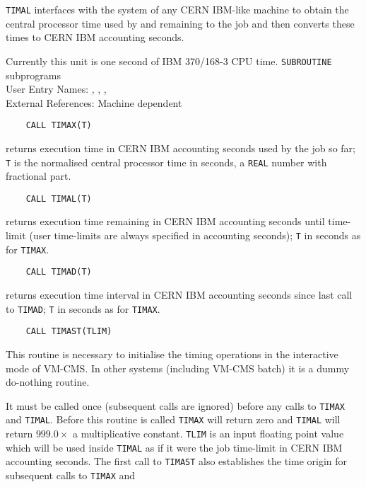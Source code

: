                    
      
\Submitter{}                            
                    
{\tt TIMAL} interfaces with the system of any CERN IBM-like machine to
obtain the central processor time used by and remaining to the job
and then converts these times to CERN IBM accounting seconds.
\par
Currently this unit is one second of IBM 370/168-3 CPU time.
\Structure
{\tt SUBROUTINE} subprograms \\
User Entry Names: , , ,
\\
External References: Machine dependent
\Usage
\begin{verbatim}
    CALL TIMAX(T)
\end{verbatim}
returns execution time in CERN IBM accounting seconds used by the job
so far; {\tt T} is the normalised central processor time in seconds,
a {\tt REAL} number with fractional part.
\begin{verbatim}
    CALL TIMAL(T)
\end{verbatim}
returns execution time remaining in CERN IBM accounting seconds
until time-limit (user time-limits are always specified in accounting
seconds); {\tt T} in  seconds as for {\tt TIMAX}.
\begin{verbatim}
    CALL TIMAD(T)
\end{verbatim}
returns execution time interval in CERN IBM accounting seconds
since last call to {\tt TIMAD}; {\tt T} in seconds as for {\tt TIMAX}.
\begin{verbatim}
    CALL TIMAST(TLIM)
\end{verbatim}
This routine is necessary to initialise the timing operations
in the interactive mode of VM-CMS. In other systems (including VM-CMS
batch) it is a dummy do-nothing routine.
\par
It must be called once (subsequent calls are ignored) before any
calls to {\tt TIMAX} and {\tt TIMAL}. Before this routine is called
{\tt TIMAX} will return zero and {\tt TIMAL} will return
$999.0 \times$ a multiplicative constant. {\tt TLIM} is an input floating
point value which will be used inside {\tt TIMAL} as if it were the job
time-limit in CERN IBM accounting seconds. The first call to {\tt TIMAST}
also establishes the time origin for subsequent calls to {\tt TIMAX} and
